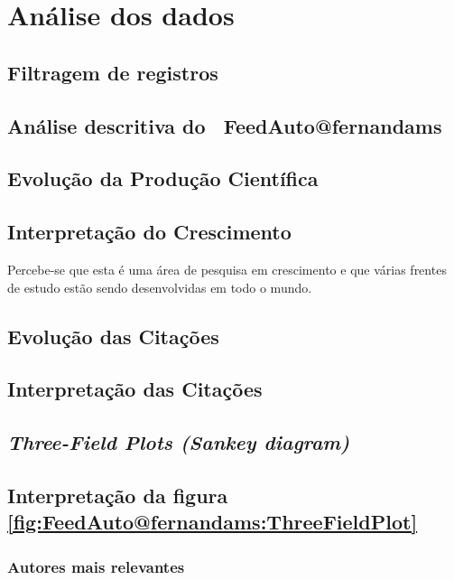\section{Análise dos dados}

\subsection{Filtragem de registros}

\subsection{Análise descritiva do \dataset\ FeedAuto@fernandams}

\subsection{Evolução da Produção Científica}

\subsection{Interpretação do Crescimento}

Percebe-se que esta é uma área de pesquisa em crescimento e que várias frentes de estudo estão sendo desenvolvidas em todo o mundo.

\subsection{Evolução das Citações}

\subsection{Interpretação das Citações}

\subsection{\textit{Three-Field Plots (Sankey diagram)} \label{FeedAuto:Sankey}}

\subsection{Interpretação da figura \ref{fig:FeedAuto@fernandams:ThreeFieldPlot}}

\subsubsection{Autores mais relevantes\label{FeedAuto:Sankey:AutoresRelevantes}}

